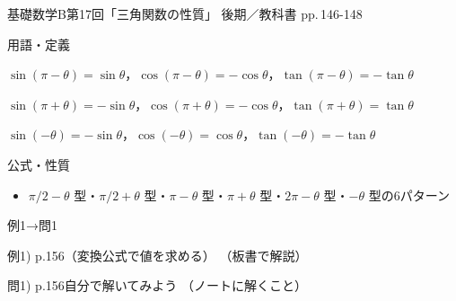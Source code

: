 \documentclass[aspectratio=43,professionalfonts,handout]{beamer}
\newcommand{\LectureNum}{17}
\newcommand{\LectureTitle}{三角関数の性質}
\newcommand{\TextPages}{pp.\,146-148}
\newcommand{\CourseName}{基礎数学B}
\renewcommand{\TermName}{後期}
\begin{document}
\begin{frame}{\CourseName\quad 第\LectureNum 回「\LectureTitle 」}
  {\small \TermName\quad \TeacherName\quad ／\quad 教科書 \TextPages}

  \begin{block}{用語・定義}
  \begin{description}[labelwidth=5.5em]
    \item[\kw{$\sin(\pi - \theta) = \sin\theta$ など（$\pi - \theta$ 型）}] $\sin(\pi-\theta) = \sin\theta$，$\cos(\pi-\theta) = -\cos\theta$，$\tan(\pi-\theta) = -\tan\theta$
    \item[\kw{$\sin(\pi + \theta) = -\sin\theta$ など（$\pi + \theta$ 型）}] $\sin(\pi+\theta) = -\sin\theta$，$\cos(\pi+\theta) = -\cos\theta$，$\tan(\pi+\theta) = \tan\theta$
    \item[\kw{$\sin(-\theta) = -\sin\theta$ など（$-\theta$ 型）}] $\sin(-\theta) = -\sin\theta$，$\cos(-\theta) = \cos\theta$，$\tan(-\theta) = -\tan\theta$
  \end{description}
  \end{block}
\end{frame}

\begin{frame}{公式・性質}
  \begin{block}{}
  \begin{itemize}
    \item $\pi/2-\theta$ 型・$\pi/2+\theta$ 型・$\pi-\theta$ 型・$\pi+\theta$ 型・$2\pi-\theta$ 型・$-\theta$ 型の6パターン
  \end{itemize}
  \end{block}
\end{frame}

\begin{frame}{例1→問1}
  \begin{exampleblock}{例1) p.156（変換公式で値を求める）}
    （板書で解説）
  \end{exampleblock}

  \vfill

  \begin{block}{問1) p.156\quad 自分で解いてみよう}
    （ノートに解くこと）
  \end{block}
\end{frame}
\end{document}
